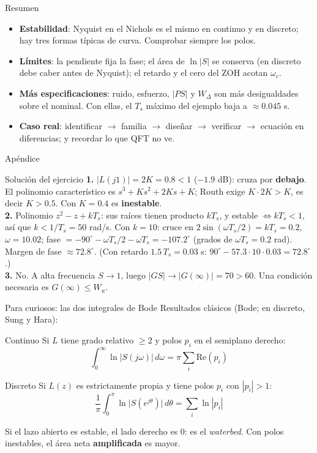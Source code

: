 \documentclass[aspectratio=169,11pt]{beamer}
\begin{document}
\begin{frame}{Resumen}
  \small
  \begin{itemize}
    \item \textbf{Estabilidad}: Nyquist en el Nichols es el mismo en continuo y en discreto; hay tres formas típicas de curva. Comprobar siempre los polos.
    \item \textbf{Límites}: la pendiente fija la fase; el área de $\ln|S|$ se conserva (en discreto debe caber antes de Nyquist); el retardo y el cero del ZOH acotan $\omega_c$.
    \item \textbf{Más especificaciones}: ruido, esfuerzo, $|PS|$ y $W_\Delta$ son más desigualdades sobre el nominal. Con ellas, el $T_s$ máximo del ejemplo baja a $\approx0.045$ s.
    \item \textbf{Caso real}: identificar $\rightarrow$ familia $\rightarrow$ diseñar $\rightarrow$ verificar $\rightarrow$ ecuación en diferencias; y recordar lo que QFT no ve.
  \end{itemize}
\end{frame}

\appendix
\begin{frame}\centering\Large Apéndice\end{frame}

\begin{frame}{Solución del ejercicio}
  \footnotesize
  \textbf{1.} $|L(j1)|=2K=0.8<1$ ($-1.9$ dB): cruza por \textbf{debajo}. El polinomio característico es $s^3+Ks^2+2Ks+K$; Routh exige $K\cdot2K>K$, es decir $K>0.5$. Con $K=0.4$ es \textbf{inestable}.\\[3pt]
  \textbf{2.} Polinomio $z^2-z+kT_s$: sus raíces tienen producto $kT_s$, y estable $\iff kT_s<1$, así que $k<1/T_s=50$ rad/s. Con $k=10$: cruce en $2\sin(\omega T_s/2)=kT_s=0.2$, $\omega=10.02$; fase $=-90^\circ-\omega T_s/2-\omega T_s=-107.2^\circ$ (grados de $\omega T_s=0.2$ rad). Margen de fase $\approx72.8^\circ$. (Con retardo $1.5\,T_s=0.03$ s: $90^\circ-57.3\cdot10\cdot0.03=72.8^\circ$.)\\[3pt]
  \textbf{3.} No. A alta frecuencia $S\to1$, luego $|GS|\to|G(\infty)|=70>60$. Una condición necesaria es $G(\infty)\le W_u$.
\end{frame}

\begin{frame}{Para curiosos: las dos integrales de Bode}
  \small
  Resultados clásicos (Bode; en discreto, Sung y Hara):
  \begin{block}{Continuo}
    Si $L$ tiene grado relativo $\ge2$ y polos $p_i$ en el semiplano derecho:
    \[ \int_0^\infty\ln|S(j\omega)|\,d\omega=\pi\sum_i\mathrm{Re}(p_i) \]
  \end{block}
  \begin{block}{Discreto}
    Si $L(z)$ es estrictamente propia y tiene polos $p_i$ con $|p_i|>1$:
    \[ \frac{1}{\pi}\int_0^{\pi}\ln\big|S(e^{j\theta})\big|\,d\theta=\sum_i\ln|p_i| \]
  \end{block}
  Si el lazo abierto es estable, el lado derecho es $0$: es el \emph{waterbed}. Con polos inestables, el área neta \textbf{amplificada} es mayor.
\end{frame}
\end{document}
